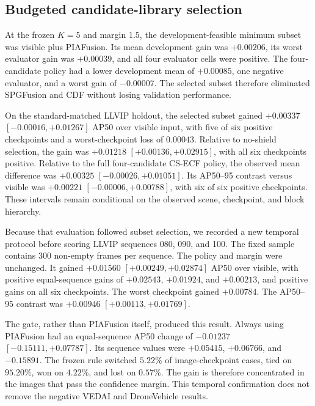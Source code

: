 \documentclass[preprint,11pt]{elsarticle}
\providecommand{\DIFaddtex}[1]{{\protect\color{blue} \sf #1}} %
\providecommand{\DIFaddbegin}{} %
\providecommand{\DIFadd}[1]{\texorpdfstring{\DIFaddtex{#1}}{#1}} %
\begin{document}
\subsection{Budgeted candidate-library selection}

At the frozen \(K=5\) and margin \(1.5\), the development-feasible minimum
subset was visible plus PIAFusion. Its mean development gain was
\(+0.00206\), its worst evaluator gain was \(+0.00039\), and all four
evaluator cells were positive. The four-candidate policy had a lower
development mean of \(+0.00085\), one negative evaluator, and a worst gain of
\(-0.00007\). The selected subset therefore eliminated SPGFusion and CDF
without losing validation performance.

On the standard-matched LLVIP holdout, the selected subset gained
\(+0.00337\) \([-0.00016,+0.01267]\) AP50 over visible input, with five of six
positive checkpoints and a worst-checkpoint loss of \(0.00043\). Relative to
no-shield selection, the gain was \(+0.01218\) \([+0.00136,+0.02915]\), with all
six checkpoints positive. Relative to the full four-candidate CS-ECF policy,
the observed mean difference was \(+0.00325\)
\([-0.00026,+0.01051]\). Its AP50--95 contrast versus visible was
\(+0.00221\) \([-0.00006,+0.00788]\), with six of six positive checkpoints.
These intervals remain conditional on the observed scene, checkpoint, and
block hierarchy.

\DIFaddbegin \DIFadd{Because that evaluation followed subset selection, we recorded a new temporal
protocol before scoring LLVIP sequences 080, 090, and 100. The fixed sample
contains 300 non-empty frames per sequence. The policy and margin were
unchanged. It gained \(+0.01560\) \([+0.00249,+0.02874]\) AP50 over visible,
with positive equal-sequence gains of \(+0.02543\), \(+0.01924\), and
\(+0.00213\), and positive gains on all six checkpoints. The worst checkpoint
gained \(+0.00784\). The AP50--95 contrast was \(+0.00946\)
\([+0.00113,+0.01769]\).
}

\DIFadd{The gate, rather than PIAFusion itself, produced this result. Always using
PIAFusion had an equal-sequence AP50 change of \(-0.01237\)
\([-0.15111,+0.07787]\). Its sequence values were \(+0.05415\), \(+0.06766\),
and \(-0.15891\). The frozen rule switched \(5.22\%\) of image-checkpoint
cases, tied on \(95.20\%\), won on \(4.22\%\), and lost on \(0.57\%\). The gain
is therefore concentrated in the images that pass the confidence margin.
This temporal confirmation does not remove the negative VEDAI and
DroneVehicle results.
}
\end{document}

